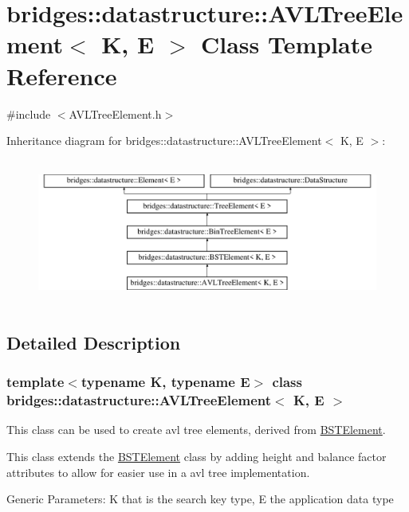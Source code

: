 \hypertarget{classbridges_1_1datastructure_1_1_a_v_l_tree_element}{}\section{bridges\+::datastructure\+::A\+V\+L\+Tree\+Element$<$ K, E $>$ Class Template Reference}
\label{classbridges_1_1datastructure_1_1_a_v_l_tree_element}


{\ttfamily \#include $<$A\+V\+L\+Tree\+Element.\+h$>$}

Inheritance diagram for bridges\+::datastructure\+::A\+V\+L\+Tree\+Element$<$ K, E $>$\+:\begin{figure}[H]
\begin{center}
\leavevmode
\includegraphics[height=4.794520cm]{classbridges_1_1datastructure_1_1_a_v_l_tree_element}
\end{center}
\end{figure}


\subsection{Detailed Description}
\subsubsection*{template$<$typename K, typename E$>$\newline
class bridges\+::datastructure\+::\+A\+V\+L\+Tree\+Element$<$ K, E $>$}

This class can be used to create avl tree elements, derived from \mbox{\hyperlink{classbridges_1_1datastructure_1_1_b_s_t_element}{B\+S\+T\+Element}}. 

This class extends the \mbox{\hyperlink{classbridges_1_1datastructure_1_1_b_s_t_element}{B\+S\+T\+Element}} class by adding height and balance factor attributes to allow for easier use in a avl tree implementation.

Generic Parameters\+: K that is the search key type, E the application data type

